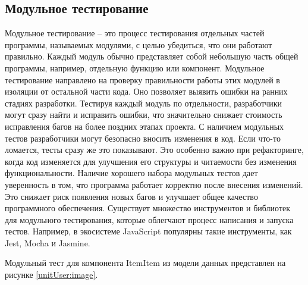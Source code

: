 \subsection{Модульное тестирование}

Модульное тестирование – это процесс тестирования отдельных частей программы, называемых модулями, с целью убедиться, что они работают правильно. Каждый модуль обычно представляет собой небольшую часть общей программы, например, отдельную функцию или компонент. Модульное тестирование направлено на проверку правильности работы этих модулей в изоляции от остальной части кода. Оно позволяет выявить ошибки на ранних стадиях разработки. Тестируя каждый модуль по отдельности, разработчики могут сразу найти и исправить ошибки, что значительно снижает стоимость исправления багов на более поздних этапах проекта. С наличием модульных тестов разработчики могут безопасно вносить изменения в код. Если что-то ломается, тесты сразу же это показывают. Это особенно важно при рефакторинге, когда код изменяется для улучшения его структуры и читаемости без изменения функциональности. Наличие хорошего набора модульных тестов дает уверенность в том, что программа работает корректно после внесения изменений. Это снижает риск появления новых багов и улучшает общее качество программного обеспечения. Существует множество инструментов и библиотек для модульного тестирования, которые облегчают процесс написания и запуска тестов. Например, в экосистеме JavaScript популярны такие инструменты, как Jest, Mocha и Jasmine.

Модульный тест для компонента ItemItem из модели данных представлен на рисунке \ref{unitUser:image}.


